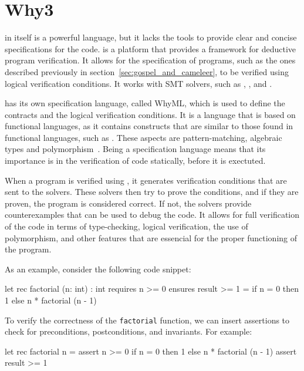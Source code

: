 \section{Why3}
\label{sec:why3}

\ocaml in itself is a powerful language, but it lacks the tools to provide clear 
and concise specifications for the code. \why is a platform that provides a framework 
for deductive program verification. It allows for the specification of programs, such as the ones 
described previously in section~\ref{sec:gospel_and_cameleer}, to be verified using 
logical verification conditions. It works with SMT solvers, such as \zthree, \altergo, 
and \coq.

\why has its own specification language, called WhyML, which is used to define the 
contracts and the logical verification conditions. It is a language that is based on 
functional languages, as it contains constructs that are similar to those found in 
functional languages, such as \ocaml. These aspects are pattern-matching, algebraic types 
and polymorphism~\cite{Pereira}. Being a specification language means that its importance is 
in the verification of code statically, before it is exectuted.

When a program is verified using \why, it generates verification conditions that are 
sent to the solvers. These solvers then try to prove the conditions, and if they are 
proven, the program is considered correct. If not, the solvers provide counterexamples 
that can be used to debug the code. It allows for full verification of the code in terms 
of type-checking, logical verification, the use of polymorphism, and other features that 
are essencial for the proper functioning of the program.

As an example, consider the following code snippet: 

\begin{whylang}
    let rec factorial (n: int) : int
        requires { n >= 0 }
        ensures { result >= 1 }
    = if n = 0 then 1 else n * factorial (n - 1)
\end{whylang}

To verify the correctness of the \texttt{factorial} function, we can insert assertions 
to check for preconditions, postconditions, and invariants. For example: 

\begin{whylang}
    let rec factorial n =
        assert { n >= 0 }
        if n = 0 then 1
        else n * factorial (n - 1)
        assert { result >= 1 }
\end{whylang}

